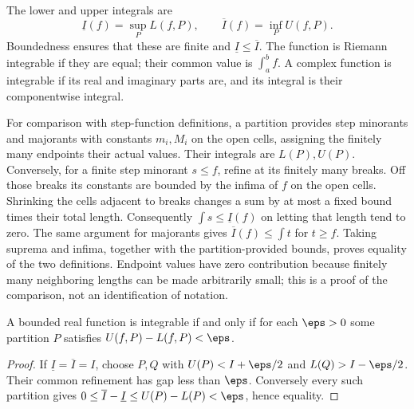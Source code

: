 \begin{definition}
The lower and upper integrals are
\[\underline{I}(f)=\sup_P L(f,P),\qquad
\overline{I}(f)=\inf_P U(f,P).
\]
Boundedness ensures that these are finite and $\underline I\le\overline I$.
The function is Riemann integrable if they are equal; their common value
is $\int_a^bf$. A complex function is integrable if its real and imaginary
parts are, and its integral is their componentwise integral.
\end{definition}
For comparison with step-function definitions, a partition provides step
minorants and majorants with constants $m_i,M_i$ on the open cells,
assigning the finitely many endpoints their actual values. Their integrals
are $L(P),U(P)$. Conversely, for a finite step minorant $s\le f$, refine
at its finitely many breaks. Off those breaks its constants are bounded by
the infima of $f$ on the open cells. Shrinking the cells adjacent to breaks
changes a sum by at most a fixed bound times their total length. Consequently
$\int s\le\underline I(f)$ on letting that length tend to zero. The same
argument for majorants gives $\overline I(f)\le\int t$ for $t\ge f$.
Taking suprema and infima, together with the partition-provided bounds,
proves equality of the two definitions. Endpoint values have zero contribution
because finitely many neighboring lengths can be made arbitrarily small;
this is a proof of the comparison, not an identification of notation.

\begin{theorem}
A bounded real function is integrable if and only if for each $\eps>0$
some partition $P$ satisfies $U(f,P)-L(f,P)<\eps$.
\end{theorem}
\begin{proof}
If $\underline I=\overline I=I$, choose $P,Q$ with
$U(P)<I+\eps/2$ and $L(Q)>I-\eps/2$. Their common refinement
has gap less than $\eps$. Conversely every such partition gives
$0\le\overline I-\underline I\le U(P)-L(P)<\eps$, hence equality.
\end{proof}

